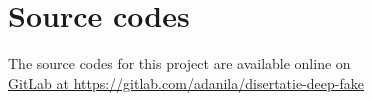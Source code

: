 \appendix
\chapter{Source codes}
\noindent
The source codes for this project are available online on \\
\href{https://gitlab.com/adanila/disertatie-deep-fake}{GitLab at https://gitlab.com/adanila/disertatie-deep-fake}